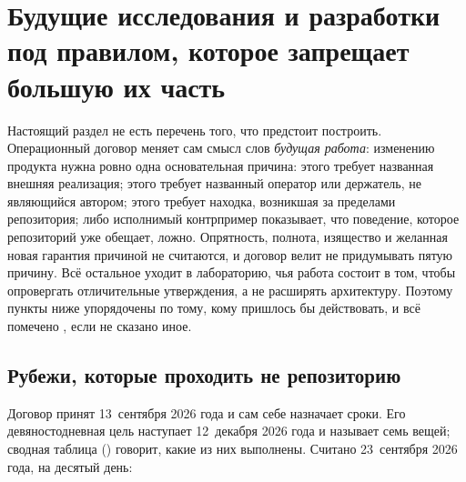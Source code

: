 \section{Будущие исследования и разработки под правилом, которое запрещает большую их часть}
\label{sec:research}



Настоящий раздел не есть перечень того, что предстоит построить. Операционный договор меняет сам
смысл слов \emph{будущая работа}: изменению продукта нужна ровно одна основательная причина:
этого требует названная внешняя реализация; этого требует названный оператор или держатель, не
являющийся автором; этого требует находка, возникшая за пределами репозитория; либо исполнимый
контрпример показывает, что поведение, которое репозиторий уже обещает, ложно. Опрятность,
полнота, изящество и желанная новая гарантия причиной не считаются, и договор велит не
придумывать пятую причину. Всё остальное уходит в лабораторию, чья работа состоит в том, чтобы
опровергать отличительные утверждения, а не расширять архитектуру. Поэтому пункты ниже
упорядочены по тому, кому пришлось бы действовать, и всё помечено \sFut, если не сказано иное.


\subsection{Рубежи, которые проходить не репозиторию}

Договор принят 13~сентября 2026 года и сам себе назначает сроки. Его девяностодневная цель наступает
12~декабря 2026 года и называет семь вещей; сводная таблица ()
говорит, какие из них выполнены. Считано 23~сентября 2026 года, на десятый день:

